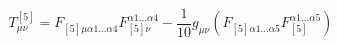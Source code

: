 \begin{equation}
T^{[5]}_{\mu\nu}=F_{[5]\mu \alpha 1 ... \alpha 4}F_{[5]\nu}^{\alpha 1 ... \alpha
4}-\frac{1}{10}g_{\mu\nu}(F_{[5]\alpha 1 ... \alpha 5}F_{[5]}^{\alpha 1 ...
\alpha 5})
\end{equation}

